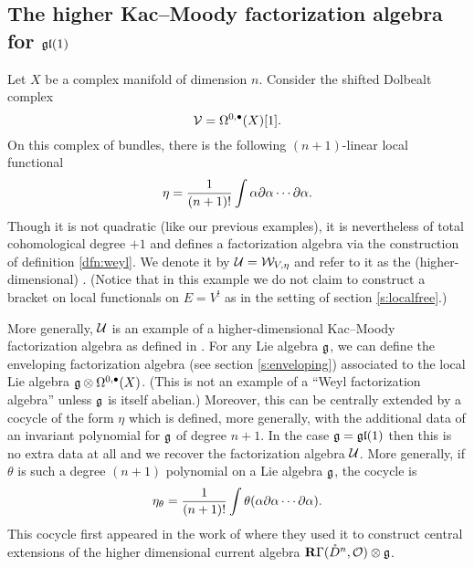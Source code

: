 \documentclass[11pt]{amsart}
\begin{document}
\subsection{The higher Kac--Moody factorization algebra for $\mathfrak{gl}(1)$}

Let $X$ be a complex manifold of dimension $n$.
Consider the shifted Dolbealt complex
\begin{equation}\label{eqn:gl1}
\mathcal V = \Omega^{0,\bullet}(X)[1] .
\end{equation}
On this complex of bundles, there is the following $(n+1)$-linear local functional
\begin{equation}\label{eqn:km}
\eta = \frac{1}{(n+1)!} \int \alpha \partial \alpha \cdots \partial \alpha .
\end{equation}
Though it is not quadratic (like our previous examples), it is nevertheless of total cohomological degree $+1$ and defines a factorization algebra via the construction of definition \ref{dfn:weyl}.
We denote it by $\mathcal U = \mathcal W_{V,\eta}$ and refer to it as the (higher-dimensional) .
(Notice that in this example we do not claim to construct a bracket on local functionals on $E = V^{!}$ as in the setting of section \ref{s:localfree}.)

More generally, $\mathcal U$ is an example of a higher-dimensional Kac--Moody factorization algebra as defined in \cite{GWkm}.
For any Lie algebra $\mathfrak{g}$, we can define the enveloping factorization algebra (see section \ref{s:enveloping}) associated to the local Lie algebra $\mathfrak{g} \otimes \Omega^{0,\bullet}(X)$.
(This is not an example of a ``Weyl factorization algebra'' unless $\mathfrak{g}$ is itself abelian.)
Moreover, this can be centrally extended by a cocycle of the form $\eta$ which is defined, more generally, with the additional data of an invariant polynomial for $\mathfrak{g}$ of degree $n+1$.
In the case $\mathfrak{g} = \mathfrak{gl}(1)$ then this is no extra data at all and we recover the factorization algebra $\mathcal U$.
More generally, if $\theta$ is such a degree $(n+1)$ polynomial on a Lie algebra $\mathfrak{g}$, the cocycle is
\begin{equation}\label{eqn:km2}
\eta_\theta = \frac{1}{(n+1)!} \int \theta(\alpha \partial \alpha \cdots \partial \alpha) .
\end{equation}
This cocycle first appeared in the work of \cite{FHK} where they used it to construct central extensions of the higher dimensional current algebra $\mathbf{R}\Gamma(\mathring{D}^{n},\mathcal O) \otimes \mathfrak{g}$.

\end{document}
